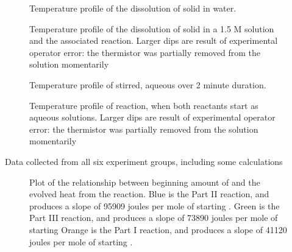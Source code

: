 \begin{figure}[H]
    \begin{center}
	
    \end{center}
    \caption{Temperature profile of the dissolution of solid \koh in water. }\label{fig:partI}
\end{figure}

\begin{figure}[H]
    \begin{center}
	
    \end{center}
    \caption{Temperature profile of the dissolution of solid \koh in a 1.5 M \hcl solution and the associated reaction.
   		Larger dips are result of experimental operator error:
		the thermistor was partially removed from the solution momentarily }\label{fig:partII}
\end{figure}

\begin{figure}[H]
    \begin{center}
	
    \end{center}
    \caption{Temperature profile of stirred, aqueous \koh over 2 minute duration. }\label{fig:partIIIa}
\end{figure}


\begin{figure}[H]
    \begin{center}
	
    \end{center}
    \caption{Temperature profile of reaction, when both reactants start as aqueous solutions.
    		Larger dips are result of experimental operator error:
		the thermistor was partially removed from the solution momentarily}\label{fig:partIIIb}
\end{figure}

\begin{table}[H]
	\doublespacing
	\centering
	\caption{Data collected from all six experiment groups, including some calculations} \label{tab:main}
	
\end{table}
\begin{figure}[H]
	\begin{center}
		
		\caption{Plot of the relationship between beginning amount of \koh and the evolved heat from the reaction.
		Blue is the Part II reaction, and produces a slope of 95909 joules per mole of starting \koh.
		Green is the Part III reaction, and produces a slope of 73890 joules per mole of starting \koh
		Orange is the Part I reaction, and produces a slope of 41120 joules per mole of starting \koh.
	}\label{fig:lin}
	\end{center}
\end{figure}

